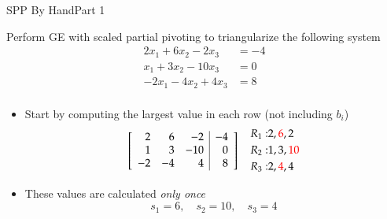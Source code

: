 \documentclass[10pt]{beamer}
\begin{document}
\begin{frame}{SPP By Hand}{Part 1}
\begin{example}
    
Perform GE with scaled partial pivoting to triangularize the following system
    \[
    \begin{aligned}
    2x_1+ 6x_2 - 2x_3  &= -4 \\
    x_1  + 3x_2 - 10x_3  &= 0 \\
    -2x_1 - 4x_2 + 4x_3  &= 8 \\
    \end{aligned}
    \]
\end{example}
\begin{itemize}
    \item Start by computing the largest value in each row (not including $b_i$)
    \[
    \left[\begin{array}{rrr|r}
    2 & 6 & -2 & -4 \\
    1 & 3 & -10 & 0 \\
    -2 & -4 & 4 & 8 \\
    \end{array}\right]\quad \begin{aligned}
        R_1:& 2, \textcolor{red}{6}, 2\\
        R_2:& 1, 3, \textcolor{red}{10}\\
        R_3:& 2, \textcolor{red}{4}, 4
    \end{aligned}
    \]
    \item These values are calculated \textit{only once}
    \[
    s_1 = 6, \quad s_2 = 10, \quad s_3 = 4 
    \]
\textbf{}
\end{itemize}


\end{frame}
\end{document}
